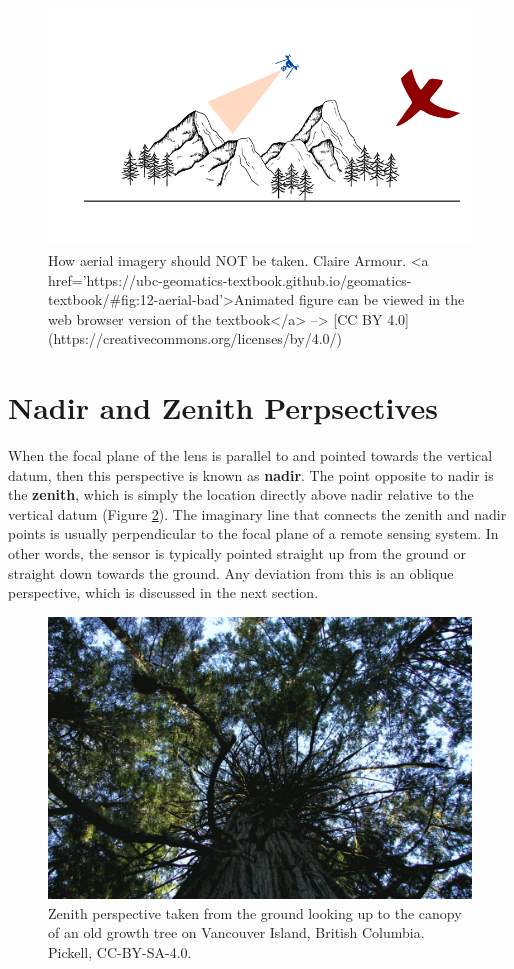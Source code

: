 \documentclass[
]{book}
\begin{document}
\begin{figure}
\includegraphics[width=0.9\linewidth]{images/12-aerial-bad} \caption{How aerial imagery should NOT be taken. Claire Armour.  <a href='https://ubc-geomatics-textbook.github.io/geomatics-textbook/#fig:12-aerial-bad'>Animated figure can be viewed in the web browser version of the textbook</a> --> [CC BY 4.0](https://creativecommons.org/licenses/by/4.0/)}\label{fig:12-aerial-bad}
\end{figure}

\hypertarget{nadir-and-zenith-perpsectives}{%
\section{Nadir and Zenith Perpsectives}\label{nadir-and-zenith-perpsectives}}

When the focal plane of the lens is parallel to and pointed towards the vertical datum, then this perspective is known as \textbf{nadir}. The point opposite to nadir is the \textbf{zenith}, which is simply the location directly above nadir relative to the vertical datum (Figure \ref{fig:12-zenith-image}). The imaginary line that connects the zenith and nadir points is usually perpendicular to the focal plane of a remote sensing system. In other words, the sensor is typically pointed straight up from the ground or straight down towards the ground. Any deviation from this is an oblique perspective, which is discussed in the next section.

\begin{figure}
\includegraphics[width=0.9\linewidth]{images/12-zenith-image} \caption{Zenith perspective taken from the ground looking up to the canopy of an old growth tree on Vancouver Island, British Columbia. Pickell, CC-BY-SA-4.0.}\label{fig:12-zenith-image}
\end{figure}
\end{document}
